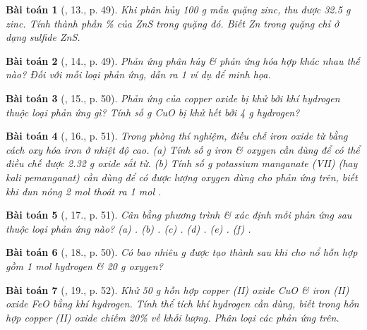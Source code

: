 \documentclass{article}
\newtheorem{baitoan}{Bài toán}
\begin{document}
\begin{baitoan}[\cite{An_Hoa_Hoc_nang_cao_8_9}, 13., p. 49]
	Khi phân hủy {\rm100 g} mẫu quặng zinc, thu được {\rm32.5 g} zinc. Tính thành phần {\rm\%} của {\rm ZnS} trong quặng đó. Biết {\rm Zn} trong quặng chỉ ở dạng sulfide {\rm ZnS}.
\end{baitoan}

\begin{baitoan}[\cite{An_Hoa_Hoc_nang_cao_8_9}, 14., p. 49]
	Phản ứng phân hủy \& phản ứng hóa hợp khác nhau thế nào? Đối với mỗi loại phản ứng, dẫn ra 1 ví dụ để minh họa.
\end{baitoan}

\begin{baitoan}[\cite{An_Hoa_Hoc_nang_cao_8_9}, 15., p. 50]
	Phản ứng của copper oxide bị khử bởi khí hydrogen thuộc loại phản ứng gì? Tính số {\rm g CuO} bị khử hết bởi {\rm4 g} hydrogen?
\end{baitoan}

\begin{baitoan}[\cite{An_Hoa_Hoc_nang_cao_8_9}, 16., p. 51]
	Trong phòng thí nghiệm, điều chế iron oxide từ {\rm{}} bằng cách oxy hóa iron ở nhiệt độ cao. (a) Tính số {\rm g} iron \& oxygen cần dùng để có thể điều chế được {\rm2.32 g} oxide sắt từ. (b) Tính số {\rm g} potassium manganate (VII) (hay kali pemanganat) {\rm{}} cần dùng để có được lượng oxygen dùng cho phản ứng trên, biết khi đun nóng {\rm2 mol } thoát ra {\rm1 mol }.
\end{baitoan}

\begin{baitoan}[\cite{An_Hoa_Hoc_nang_cao_8_9}, 17., p. 51]
	Cân bằng phương trình \& xác định mỗi phản ứng sau thuộc loại phản ứng nào? {\rm(a) . (b) . (c) . (d) . (e) . (f) .}
\end{baitoan}

\begin{baitoan}[\cite{An_Hoa_Hoc_nang_cao_8_9}, 18., p. 50]
	Có bao nhiêu {\rm g } được tạo thành sau khi cho nổ hỗn hợp gồm {\rm1 mol} hydrogen \& {\rm20 g} oxygen?
\end{baitoan}

\begin{baitoan}[\cite{An_Hoa_Hoc_nang_cao_8_9}, 19., p. 52]
	Khử {\rm50 g} hỗn hợp copper (II) oxide {\rm CuO} \& iron (II) oxide {\rm FeO} bằng khí hydrogen. Tính thể tích khí hydrogen cần dùng, biết trong hỗn hợp copper (II) oxide chiếm {\rm20\%} về khối lượng. Phân loại các phản ứng trên.
\end{baitoan}
\end{document}
